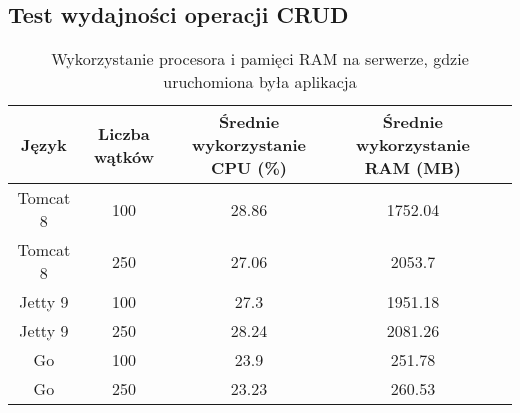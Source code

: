  \newpage
 \subsection{Test wydajności operacji CRUD}
% 
 \clearpage

\begin{table}[!htb]
\centering
\caption{Wykorzystanie procesora i pamięci RAM na serwerze, gdzie uruchomiona była aplikacja}
\label{tab:app-full-crud}
\begin{tabular}{@{}ccccl@{}}
\toprule
\textbf{Język} & \textbf{Liczba wątków} & \multicolumn{1}{p{3cm}}{\textbf{Średnie wykorzystanie CPU (\%)}} & \multicolumn{1}{p{3cm}}{\textbf{Średnie wykorzystanie RAM (MB)}} &  \\ \midrule
Tomcat 8       & 100                    & 28.86                             & 1752.04                          &  \\
Tomcat 8       & 250                    & 27.06                             & 2053.7                          &  \\
Jetty 9       & 100                    & 27.3                             & 1951.18                          &  \\
Jetty 9       & 250                    & 28.24                             & 2081.26                          &  \\
Go       & 100                    & 23.9                             & 251.78                          &  \\
Go       & 250                    & 23.23                             & 260.53                          &  \\
\bottomrule
\end{tabular}
\end{table}


